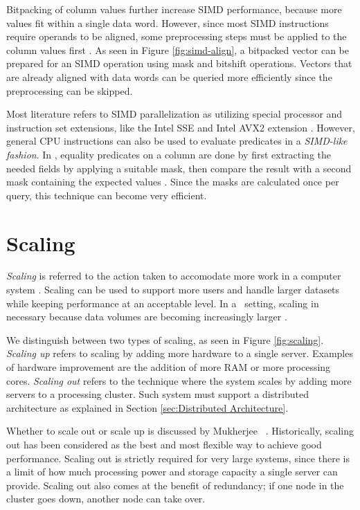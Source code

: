 Bitpacking of column values further increase SIMD performance, because more values fit within a single data word. However, since most SIMD instructions require operands to be aligned, some preprocessing steps must be applied to the column values first \cite{Willhalm2009-hu}. As seen in Figure \ref{fig:simd-align}, a bitpacked vector can be prepared for an SIMD operation using mask and bitshift operations. Vectors that are already aligned with data words can be queried more efficiently since the preprocessing can be skipped.

Most literature refers to SIMD parallelization as utilizing special processor and instruction set extensions, like the Intel SSE and Intel AVX2 extension \cite{Willhalm2013-ri, Willhalm2009-hu}. However, general CPU instructions can also be used to evaluate predicates in a \textit{SIMD-like fashion}. In \blink, equality predicates on a column are done by first extracting the needed fields by applying a suitable mask, then compare the result with a second mask containing the expected values \cite{Johnson2008-cp}. Since the masks are calculated once per query, this technique can become very efficient.

\section{Scaling}
\label{sec:Scaling}
\textit{Scaling} is referred to the action taken to accomodate more work in a computer system \cite{Wikipedia_contributors2015-lw}. Scaling can be used to support more users and handle larger datasets while keeping performance at an acceptable level. In a \bd~setting, scaling in necessary because data volumes are becoming increasingly larger \cite{Qlik2012-ku}.


We distinguish between two types of scaling, as seen in Figure \ref{fig:scaling}. \textit{Scaling up} refers to scaling by adding more hardware to a single server. Examples of hardware improvement are the addition of more RAM or more processing cores. \textit{Scaling out} refers to the technique where the system scales by adding more servers to a processing cluster. Such system must support a distributed architecture as explained in Section \ref{sec:Distributed Architecture}.

Whether to scale out or scale up is discussed by Mukherjee \ea~\cite{Mukherjee2015-ul}. Historically, scaling out has been considered as the best and most flexible way to achieve good performance. Scaling out is strictly required for very large systems, since there is a limit of how much processing power and storage capacity a single server can provide. Scaling out also comes at the benefit of redundancy; if one node in the cluster goes down, another node can take over.

